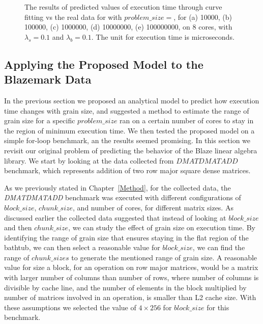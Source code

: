 \begin{figure}[H]
{		\label{fig51:d}}\hfill
	\caption{The results of predicted values of execution time through curve fitting vs the real data for with $problem\_size=$, for (a) 10000, (b) 100000, (c) 1000000, (d) 10000000, (e) 100000000, on 8 cores, with $\lambda_{s}=0.1$ and $\lambda_{b}=0.1$. The unit for execution time is microseconds.}
	\label{fig51}	
\end{figure}



\subsection{Applying the Proposed Model to the Blazemark Data}
In the previous section we proposed an analytical model to predict how execution time changes with grain size, and suggested a method to estimate the range of grain size for a specific $problem\_{size}$ ran on a certain number of cores to stay in the region of minimum execution time. We then tested the proposed model on a simple for-loop benchmark, an the results seemed promising.
In this section we revisit our original problem of predicting the behavior of the Blaze linear algebra library. 
We start by looking at the data collected from $DMATDMATADD$ benchmark, which represents addition of two row major square dense matrices.
  
As we previously stated in Chapter~\ref{Method}, for the collected data, the \emph{DMATDMATADD} benchmark was executed with different configurations of $block\_{size}$, $chunk\_{size}$, and number of cores, for different matrix sizes. 
As discussed earlier the collected data suggested that instead of looking at $block\_{size}$ and then $chunk\_{size}$, we can study the effect of grain size on execution time. By identifying the range of grain size that ensures staying in the flat region of the bathtub, we can then select a reasonable value for $block\_{size}$, we can find the range of $chunk\_{sizes}$ to generate the mentioned range of grain size. A reasonable value for size a block, for an operation on row major matrices, would be a matrix with larger number of columns than number of rows, where number of columns is divisible by cache line, and the number of elements in the block multiplied by number of matrices involved in an operation, is smaller than L2 cache size. With these assumptions we selected the value of $4\times{256}$ for $block\_{size}$ for this benchmark.

